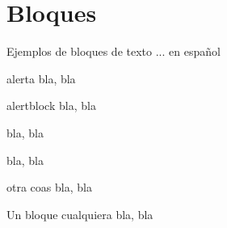 \documentclass[10pt, envcountsect, presentation, aspectratio=43]{beamer}
\begin{document}
\section{Bloques}




\begin{frame}{Ejemplos de bloques de texto ... en español}




\begin{alert}{alerta}
	bla, bla
\end{alert}

\begin{alertblock}{alertblock}
	bla, bla
\end{alertblock}


\begin{example}[example]
	bla, bla
\end{example}


\begin{examples}
	bla, bla
\end{examples}

\begin{exampleblock}{\faHandPointRight\/ otra coas}
\faHandPointRight[regular]\/ 	bla, bla
\end{exampleblock}



\begin{block}{Un bloque cualquiera}
    bla, bla
\end{block}

	
\end{frame}



\end{document}
